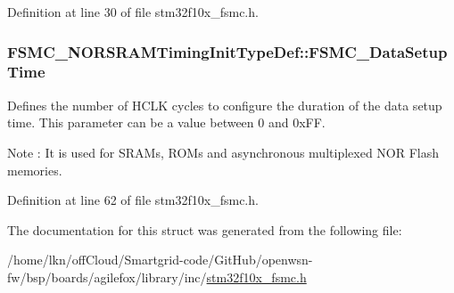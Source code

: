 Definition at line 30 of file stm32f10x\+\_\+fsmc.\+h.

\subsubsection[{\texorpdfstring{F\+S\+M\+C\+\_\+\+Data\+Setup\+Time}{FSMC_DataSetupTime}}]{ F\+S\+M\+C\+\_\+\+N\+O\+R\+S\+R\+A\+M\+Timing\+Init\+Type\+Def\+::\+F\+S\+M\+C\+\_\+\+Data\+Setup\+Time}\hypertarget{struct_f_s_m_c___n_o_r_s_r_a_m_timing_init_type_def_aaa0a9178766adeed424d5c4eb728d1b1}{}\label{struct_f_s_m_c___n_o_r_s_r_a_m_timing_init_type_def_aaa0a9178766adeed424d5c4eb728d1b1}
Defines the number of H\+C\+LK cycles to configure the duration of the data setup time. This parameter can be a value between 0 and 0x\+FF. \begin{DoxyNote}{Note}
\+: It is used for S\+R\+A\+Ms, R\+O\+Ms and asynchronous multiplexed N\+OR Flash memories. 
\end{DoxyNote}


Definition at line 62 of file stm32f10x\+\_\+fsmc.\+h.



The documentation for this struct was generated from the following file\+:\begin{DoxyCompactItemize}
\item 
/home/lkn/off\+Cloud/\+Smartgrid-\/code/\+Git\+Hub/openwsn-\/fw/bsp/boards/agilefox/library/inc/\hyperlink{agilefox_2library_2inc_2stm32f10x__fsmc_8h}{stm32f10x\+\_\+fsmc.\+h}\end{DoxyCompactItemize}
